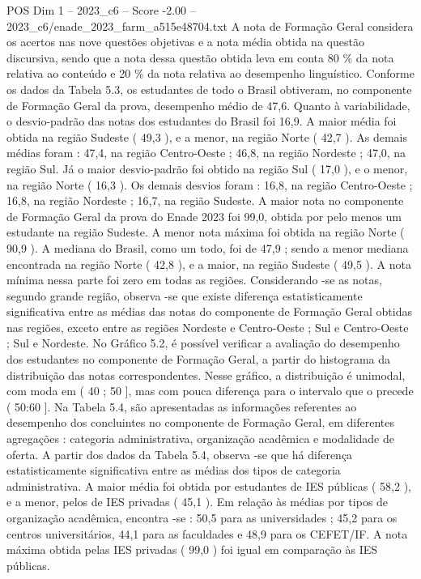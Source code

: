 \begin{textsample}{POS Dim 1 – 2023\_c6 – Score -2.00 – 2023\_c6/enade\_2023\_farm\_a515e48704.txt}
A nota de Formação Geral considera os acertos nas nove questões objetivas e a nota média obtida na questão discursiva, sendo que a nota dessa questão obtida leva em conta 80 \% da nota relativa ao conteúdo e 20 \% da nota relativa ao desempenho linguístico.
Conforme os dados da Tabela 5.3, os estudantes de todo o Brasil obtiveram, no componente de Formação Geral da prova, desempenho médio de 47,6.
Quanto à variabilidade, o desvio-padrão das notas dos estudantes do Brasil foi 16,9.
A maior média foi obtida na região Sudeste ( 49,3 ), e a menor, na região Norte ( 42,7 ).
As demais médias foram : 47,4, na região Centro-Oeste ; 46,8, na região Nordeste ; 47,0, na região Sul.
Já o maior desvio-padrão foi obtido na região Sul ( 17,0 ), e o menor, na região Norte ( 16,3 ).
Os demais desvios foram : 16,8, na região Centro-Oeste ; 16,8, na região Nordeste ; 16,7, na região Sudeste.
A maior nota no componente de Formação Geral da prova do Enade 2023 foi 99,0, obtida por pelo menos um estudante na região Sudeste.
A menor nota máxima foi obtida na região Norte ( 90,9 ).
A mediana do Brasil, como um todo, foi de 47,9 ; sendo a menor mediana encontrada na região Norte ( 42,8 ), e a maior, na região Sudeste ( 49,5 ).
A nota mínima nessa parte foi zero em todas as regiões.
Considerando -se as notas, segundo grande região, observa -se que existe diferença estatisticamente significativa entre as médias das notas do componente de Formação Geral obtidas nas regiões, exceto entre as regiões Nordeste e Centro-Oeste ; Sul e Centro-Oeste ; Sul e Nordeste.
No Gráfico 5.2, é possível verificar a avaliação do desempenho dos estudantes no componente de Formação Geral, a partir do histograma da distribuição das notas correspondentes.
Nesse gráfico, a distribuição é unimodal, com moda em ( 40 ; 50 ], mas com pouca diferença para o intervalo que o precede ( 50:60 ].
Na Tabela 5.4, são apresentadas as informações referentes ao desempenho dos concluintes no componente de Formação Geral, em diferentes agregações : categoria administrativa, organização acadêmica e modalidade de oferta.
A partir dos dados da Tabela 5.4, observa -se que há diferença estatisticamente significativa entre as médias dos tipos de categoria administrativa.
A maior média foi obtida por estudantes de IES públicas ( 58,2 ), e a menor, pelos de IES privadas ( 45,1 ).
Em relação às médias por tipos de organização acadêmica, encontra -se : 50,5 para as universidades ; 45,2 para os centros universitários, 44,1 para as faculdades e 48,9 para os CEFET/IF.
A nota máxima obtida pelas IES privadas ( 99,0 ) foi igual em comparação às IES públicas.

\end{textsample}
